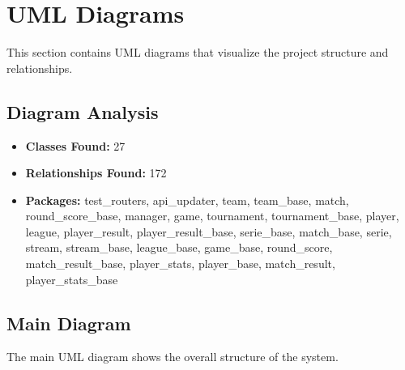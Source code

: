\documentclass[11pt,a4paper]{article}
\begin{document}
\vspace{1em}

\section{UML Diagrams}

This section contains UML diagrams that visualize the project structure and relationships.

\subsection{Diagram Analysis}

\begin{itemize}
    \item \textbf{Classes Found:} 27
    \item \textbf{Relationships Found:} 172
    \item \textbf{Packages:} test\_routers, api\_updater, team, team\_base, match, round\_score\_base, manager, game, tournament, tournament\_base, player, league, player\_result, player\_result\_base, serie\_base, match\_base, serie, stream, stream\_base, league\_base, game\_base, round\_score, match\_result\_base, player\_stats, player\_base, match\_result, player\_stats\_base
\end{itemize}

\subsection{Main Diagram}

The main UML diagram shows the overall structure of the system.
\end{document}
